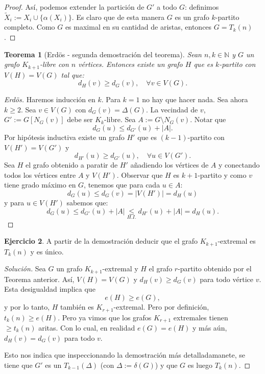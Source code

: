 \documentclass[12pt]{report}
\theoremstyle{plain}
\newtheorem{theorem}{Teorema}[section]
\theoremstyle{definition}
\newtheorem{exercise}[theorem]{Ejercicio}
\newenvironment{solution}{\begin{proof}[Solución]}{\end{proof}}
\newcommand{\naturals}{\mathbb{N}}
\newcommand{\abs}[1]{\left \vert #1 \right \vert}
\begin{document}
\begin{proof}
Así, podemos extender la partición de $G'$ a todo $G$: definimos $\tilde X_i := X_i \cup \{\alpha (X_i)\}$. Es claro que de esta manera $G$ es un grafo $k$-partito completo. Como $G$ es maximal en su cantidad de aristas, entonces $G = T_k (n)$.
\end{proof}




\begin{theorem}[Erdös - segunda demostración del teorema]
Sean $n, k  \in \naturals    $ y $G$ un grafo $K_{k+1}$-libre con $n$ vértices. Entonces existe un grafo $H$ que es $k$-partito con $V(H) = V(G)$ tal que:
\[
    d_H (v) \geq d_G (v) , \quad \forall v \in V(G).
\]
\end{theorem}
\begin{proof}[Erdös]
Haremos inducción en $k$. Para $k = 1$ no hay que hacer nada. Sea ahora $k \geq 2$. Sea $v \in V(G)$ con $d_G (v) = \Delta (G)$. La vecindad de $v$, $G' := G[N_G (v)]$ debe ser $K_{k}$-libre. Sea $A := G \setminus N_G (v)$. Notar que
\[
    d_{G} (u) \leq d_{G'} (u) + \abs A.
\]
Por hipótesis inductiva existe un grafo $H'$ que es $(k-1)$-partito con $V(H') = V(G')$ y
\[
    d_{H'} (u) \geq d_{G'} (u), \quad \forall u \in V(G').
\]
Sea $H$ el grafo obtenido a paratir de $H'$ añadiendo los vértices de $A$ y conectando todos los vértices entre $A$ y $V(H')$. Observar que $H$ es $k+1$-partito y como $v$ tiene grado máximo en $G$, tenemos que para cada $u \in A$:
\[
    d_G (u) \leq d_G (v) = \abs{V(H')} = d_H (u)
\]
y para $u \in V(H')$ sabemos que:
\[
    d_G (u) \leq d_{G'} (u) + \abs A    \underset{H.I.}{\leq} d_{H'} (u) + \abs A = d_H (u).
\]
\end{proof}

\begin{exercise}
A partir de la demostración deducir que el grafo $K_{k+1}$-extremal es $T_k (n)$ y es único.
\end{exercise}
\begin{solution}
Sea $G$ un grafo $K_{k+1}$-extremal y $H$ el grafo $r$-partito obtenido por el Teorema anterior. Así, $V(H) = V(G)$ y $d_H (v) \geq d_G (v)$ para todo vértice $v$. Esta desigualdad implica que
\[
    e(H) \geq e(G),
\]
y por lo tanto, $H$ también es $K_{r+1}$-extremal. Pero por definición, $t_k (n) \geq e(H)$. Pero ya vimos que los grafos $K_{r+1}$ extremales tienen $\geq t_k (n)$ aritas. Con lo cual, en realidad $e(G) = e(H)$ y más aún, $d_H (v) = d_G (v)$ para todo $v$.

Esto nos indica que inspeccionando la demostración más detalladamanete, se tiene que $G'$ es un $T_{k-1} (\Delta)$ (con $\Delta := \delta (G)$) y que $G$ es luego $T_k (n)$.
\end{solution}
\end{document}
